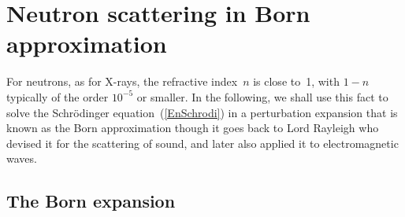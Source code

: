 \section{Neutron scattering in Born approximation}

For neutrons, as for X-rays, the refractive index~$n$ is close to~1,
with $1-n$ typically of the order $10^{-5}$ or smaller.
In the following,
we shall use this fact to solve the Schrödinger equation~(\ref{EnSchrodi})
in a perturbation expansion
that is known as the Born approximation
though it goes back to Lord Rayleigh
who devised it for the scattering of sound,
and later also applied it to electromagnetic waves.

\subsection{The Born expansion}

